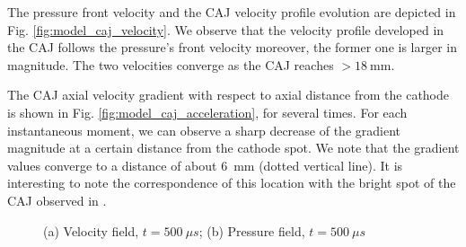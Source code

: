 \documentclass[a4paper]{iacas}%
\begin{document}
The pressure front velocity and the CAJ velocity profile evolution are depicted in Fig. \ref{fig:model_caj_velocity}. We observe that the velocity profile developed in the CAJ  follows the pressure's front velocity moreover, the former one is larger in magnitude. The two velocities converge as the CAJ reaches $> 18~\mathrm{mm}$. 

The CAJ axial velocity gradient with respect to axial distance from the cathode is shown in Fig. \ref{fig:model_caj_acceleration}, for several times. For each instantaneous moment, we can observe a sharp decrease of the gradient magnitude at a certain distance from the cathode spot. We note that the gradient values converge to a distance of about 6~mm (dotted vertical line). It is interesting to note the correspondence of this location with the bright spot of the CAJ observed in \cite{KR}.

\begin{figure}
	\centering
	
	
	\caption{(a) Velocity field, $ t = 500~\mu s $; (b) Pressure field, $ t = 500~\mu s $}
\end{figure}
\end{document}
